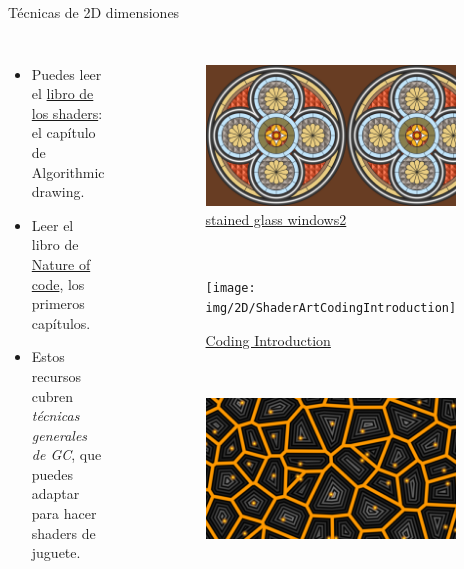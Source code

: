\begin{frame}{Técnicas de 2D dimensiones}
\begin{columns}
    \begin{itemize}
         \item Puedes leer el \href{https://thebookofshaders.com/05/}{libro de los shaders}: el capítulo de Algorithmic drawing.
         \item Leer el libro de \href{https://natureofcode.com/}{Nature of code}, los primeros capítulos.
         \item Estos recursos cubren \emph{técnicas generales de GC}, que puedes adaptar para hacer shaders de juguete.
     \end{itemize}
\begin{figure}[htp]
 \centering
 \begin{subfigure}[b]{0.42\textwidth}
   \includegraphics[width=\textwidth]{img/2D/stainedGlassWindows2}
   \caption{\href{https://www.shadertoy.com/view/3cXSz4}{stained glass windows2}}
 \end{subfigure}
~
 \begin{subfigure}[b]{0.42\textwidth}
   \texttt{[image: img/2D/ShaderArtCodingIntroduction]}
   \caption{\href{https://www.shadertoy.com/view/mtyGWy}{Coding Introduction}}
 \end{subfigure}
\\
 \begin{subfigure}[b]{0.42\textwidth}
   \includegraphics[width=\textwidth]{img/2D/VoronoiDistances}

\end{subfigure}
\end{figure}
\end{columns}
\end{frame}

